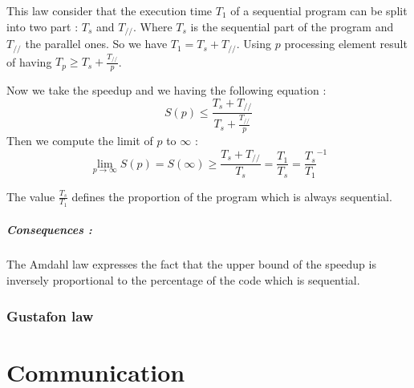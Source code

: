 \documentclass[11pt,a4paper]{report}
\begin{document}
This law consider that the execution time $T_1$ of a sequential program can be split into two part : $T_s$ and $T_{//}$. Where $T_s$ is the sequential part of the program and $T_{//}$ the parallel ones. So we have $T_1 = T_s + T_{//}$. Using $p$ processing element result of having $T_p \geq T_s + \frac{T_{//}}{p}$.

Now we take the speedup and we having the following equation :
$$
S(p) \leq \frac{T_s+T_{//}}{T_s + \frac{T_{//}}{p}}
$$
Then we compute the limit of $p$ to $\infty$ :
$$
\lim_{p\rightarrow \infty} S(p) = S(\infty) \geq \frac{T_s + T_{//}}{T_s} = \frac{T_1}{T_s} = \frac{T_s}{T_1}^{-1}
$$

The value $\frac{T_s}{T_1}$ defines the proportion of the program which is always sequential.

\paragraph*{Consequences :} The Amdahl law expresses the fact that the upper bound of the speedup is inversely proportional to the percentage of the code which is sequential.


\subsection{Gustafon law} %
\label{sub:Gustafon law}






\chapter{Communication} %
\label{cha:Communication}

\end{document}
